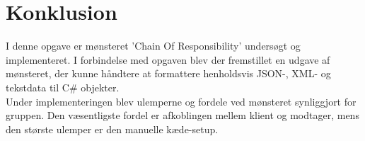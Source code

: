 \chapter{Konklusion}\label{ch:konclusion}
I denne opgave er mønsteret 'Chain Of Responsibility' undersøgt og implementeret. I forbindelse med opgaven blev der fremstillet en udgave af mønsteret, der kunne håndtere at formattere henholdsvis JSON-, XML- og tekstdata til C\# objekter.\\
Under implementeringen blev ulemperne og fordele ved mønsteret synliggjort for gruppen. Den væsentligste fordel er afkoblingen mellem klient og modtager, mens den største ulemper er den manuelle kæde-setup.